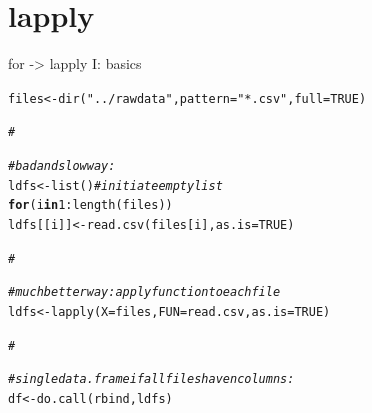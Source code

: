 \documentclass[xcolor=table,      handout ,    xcolor=dvipsnames]{beamer}\usepackage[]{graphicx}\usepackage[]{color}
\makeatletter
\newcommand{\hlnum}[1]{\textcolor[rgb]{0,0,0}{#1}}
\newcommand{\hlstr}[1]{\textcolor[rgb]{0.545,0.137,0.137}{#1}}
\newcommand{\hlcom}[1]{\textcolor[rgb]{0,0.392,0}{\textit{#1}}}
\newcommand{\hlopt}[1]{\textcolor[rgb]{0,0,0}{#1}}
\newcommand{\hlstd}[1]{\textcolor[rgb]{0,0,0}{#1}}
\newcommand{\hlkwa}[1]{\textcolor[rgb]{1,0,0}{\textbf{#1}}}
\newcommand{\hlkwb}[1]{\textcolor[rgb]{0,0,0}{#1}}
\newcommand{\hlkwc}[1]{\textcolor[rgb]{1,0,1}{#1}}
\newcommand{\hlkwd}[1]{\textcolor[rgb]{0,0,1}{#1}}
\newenvironment{kframe}{%
 \def\at@end@of@kframe{}%
 \ifinner\ifhmode%
  \def\at@end@of@kframe{\end{minipage}}%
  \begin{minipage}{\columnwidth}%
 \fi\fi%
 \def\FrameCommand##1{\hskip\@totalleftmargin \hskip-\fboxsep
 \colorbox{shadecolor}{##1}\hskip-\fboxsep
     \hskip-\linewidth \hskip-\@totalleftmargin \hskip\columnwidth}%
 \MakeFramed {\advance\hsize-\width
   \@totalleftmargin\z@ \linewidth\hsize
   \@setminipage}}%
 {\par\unskip\endMakeFramed%
 \at@end@of@kframe}
\newenvironment{knitrout}{}{} %
\makeatother
\begin{document}
\section{lapply}

\begin{frame}[fragile]{for -> lapply I: basics}
\vspace{-1em}
\begin{knitrout}
\color{fgcolor}\begin{kframe}
\begin{alltt}
\hlstd{files} \hlkwb{<-} \hlkwd{dir}\hlstd{(}\hlstr{"../rawdata"}\hlstd{,} \hlkwc{pattern}\hlstd{=}\hlstr{"*.csv"}\hlstd{,} \hlkwc{full}\hlstd{=}\hlnum{TRUE}\hlstd{)}

\hlcom{#}
\end{alltt}
\end{kframe}
\end{knitrout}
\pause \vspace{-2.7em}
\begin{knitrout}
\color{fgcolor}\begin{kframe}
\begin{alltt}
\hlcom{# bad and slow way:}
\hlstd{ldfs} \hlkwb{<-} \hlkwd{list}\hlstd{()} \hlcom{# initiate empty list}
\hlkwa{for}\hlstd{(i} \hlkwa{in} \hlnum{1}\hlopt{:}\hlkwd{length}\hlstd{(files))}
   \hlstd{ldfs[[i]]} \hlkwb{<-} \hlkwd{read.csv}\hlstd{(files[i],} \hlkwc{as.is}\hlstd{=}\hlnum{TRUE}\hlstd{)}

\hlcom{#}
\end{alltt}
\end{kframe}
\end{knitrout}
\pause \vspace{-2.7em}
\begin{knitrout}
\color{fgcolor}\begin{kframe}
\begin{alltt}
\hlcom{# much better way: apply function to each file}
\hlstd{ldfs} \hlkwb{<-} \hlkwd{lapply}\hlstd{(}\hlkwc{X}\hlstd{=files,} \hlkwc{FUN}\hlstd{=read.csv,} \hlkwc{as.is}\hlstd{=}\hlnum{TRUE}\hlstd{)}

\hlcom{#}
\end{alltt}
\end{kframe}
\end{knitrout}
\pause \vspace{-2.7em}
\begin{knitrout}
\color{fgcolor}\begin{kframe}
\begin{alltt}
\hlcom{# single data.frame if all files have n columns:}
\hlstd{df} \hlkwb{<-} \hlkwd{do.call}\hlstd{(rbind, ldfs)}


\end{alltt}
\end{kframe}
\end{knitrout}
\end{frame}
\end{document}
